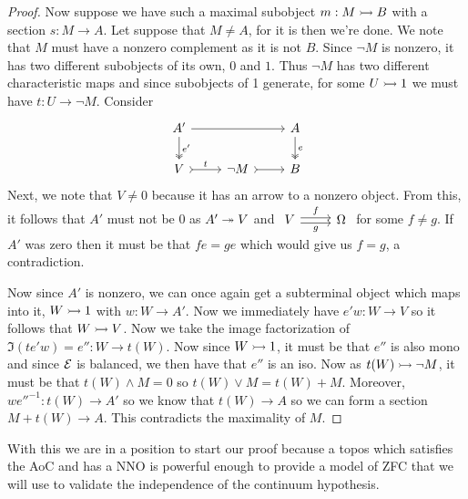 \begin{proof}
  Now suppose we have such a maximal subobject $m : M \rightarrowtail B$ with a
  section $s : M \to A$. Let suppose that $M \neq A$, for it is then
  we're done. We note that $M$ must have a nonzero complement as it is
  not $B$. Since $\neg M$ is nonzero, it has two different subobjects
  of its own, $0$ and $1$. Thus $\neg M$ has two different
  characteristic maps and since subobjects of 1 generate, for some
  $U \rightarrowtail 1$ we must have $t : U \to \neg M$. Consider
  \[
    \begin{tikzcd}
      A' \ar[d, "e'", twoheadrightarrow] \ar[rr] & & A \ar[d, twoheadrightarrow, "e"]\\
      V \ar[r, rightarrowtail, "t"] & \neg M \ar[r, rightarrowtail] & B
    \end{tikzcd}
  \]
  Next, we note that $V \neq 0$ because it has an arrow to a nonzero
  object. From this, it follows that $A'$ must not be 0 as $A' \twoheadrightarrow V$
  and
  $\begin{tikzcd}
    V \ar[r, "f", shift left=0.2em] \ar[r, "g", swap, shift right=0.2em] & \Omega
  \end{tikzcd}$
  for some $f \neq g$. If $A'$ was zero then it must be that $fe = ge$
  which would give us $f = g$, a contradiction.

  Now since $A'$ is nonzero, we can once again get a subterminal
  object which maps into it, $W \rightarrowtail 1$ with $w : W \to A'$. Now we
  immediately have $e'w : W \to V$ so it follows that $W \rightarrowtail V$. Now
  we take the image factorization of $\Im(te'w) = e'' : W \to t(W)$.
  Now since $W \rightarrowtail 1$, it must be that $e''$ is also mono and since
  $\mathcal{E}$ is balanced, we then have that $e''$ is an iso. Now as
  $t(W) \rightarrowtail \neg M$, it must be that $t(W) \wedge M = 0$ so
  $t(W) \vee M = t(W) + M$. Moreover, $we''^{-1} : t(W) \to A'$ so we
  know that $t(W) \to A$ so we can form a section $M + t(W) \to A$.
  This contradicts the maximality of $M$.
\end{proof}

With this we are in a position to start our proof because a topos
which satisfies the AoC and has a NNO is powerful enough to provide a
model of ZFC that we will use to validate the independence of the
continuum hypothesis.
